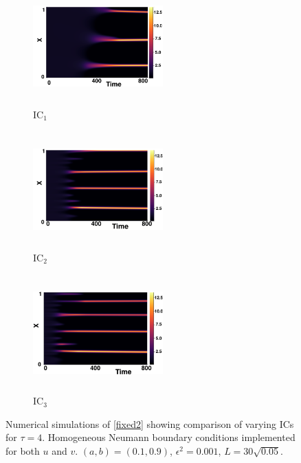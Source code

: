 \begin{figure}[H]
    \centering
    \begin{subfigure}[b]{0.32\textwidth}
        \centering
        \includegraphics[width=5cm,height=4.5cm]{gaff4.png}
        \caption{$\text{IC}_1$}
        \label{}
    \end{subfigure}
    \hfill
    \begin{subfigure}[b]{0.32\textwidth}
        \centering
        \includegraphics[width=5cm,height=4.5cm]{ic24.png}
        \caption{$\text{IC}_2$}
        \label{}
    \end{subfigure}
    \hfill
    \begin{subfigure}[b]{0.32\textwidth}
        \centering
        \includegraphics[width=5cm,height=4.5cm]{ic34.png}
        \caption{$\text{IC}_3$}
        \label{}
    \end{subfigure}
    \caption{Numerical simulations of \eqref{fixed2} showing comparison of varying ICs for $\tau=4$. Homogeneous Neumann boundary conditions implemented for both $u$ and $v$. $(a,b)=(0.1,0.9)$, $\epsilon^2=0.001$, $L=30\sqrt{0.05}$.}
    \label{fig:figtau4}
\end{figure}
